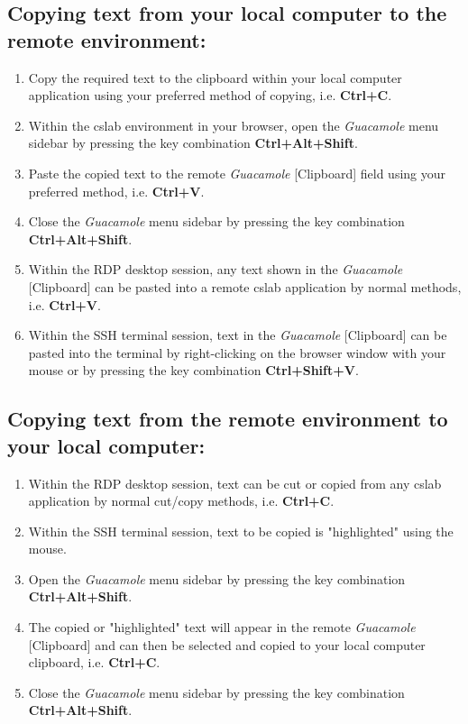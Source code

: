 \documentclass[12pt]{article}
\begin{document}
\subsection*{Copying text from your local computer to the remote environment:}
\begin{enumerate}
\item Copy the required text to the clipboard within your local computer application using your preferred method of copying, i.e. \textbf{Ctrl+C}.
\item Within the cslab environment in your browser, open the \textit{Guacamole} menu sidebar by pressing the key combination \textbf{Ctrl+Alt+Shift}.
\item Paste the copied text to the remote \textit{Guacamole} [Clipboard] field using your preferred method, i.e. \textbf{Ctrl+V}.
\item Close the \textit{Guacamole} menu sidebar by pressing the key combination \textbf{Ctrl+Alt+Shift}.
\item Within the RDP desktop session, any text shown in the \textit{Guacamole} [Clipboard] can be pasted into a remote cslab application by normal methods, i.e. \textbf{Ctrl+V}.
\item Within the SSH terminal session, text in the \textit{Guacamole} [Clipboard] can be pasted into the terminal by right-clicking on the browser window with your mouse or by pressing the key combination \textbf{Ctrl+Shift+V}.
\end{enumerate}

\subsection*{Copying text from the remote environment to your local computer:}
\begin{enumerate}
\item Within the RDP desktop session, text can be cut or copied from any cslab application by normal cut/copy methods, i.e. \textbf{Ctrl+C}.
\item Within the SSH terminal session, text to be copied is "highlighted" using the mouse.
\item Open the \textit{Guacamole} menu sidebar by pressing the key combination \textbf{Ctrl+Alt+Shift}.
\item The copied or "highlighted" text will appear in the remote \textit{Guacamole} [Clipboard] and can then be selected and copied to your local computer clipboard, i.e. \textbf{Ctrl+C}.
\item Close the \textit{Guacamole} menu sidebar by pressing the key combination \textbf{Ctrl+Alt+Shift}.
\end{enumerate}
\end{document}
